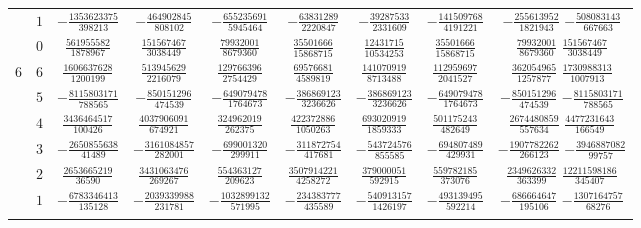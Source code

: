 \begin{table}
\begin{center}
\begin{tabular}{ccccccccc}
           &  $1$  &  $-\frac{ 1353623375}{ 398213} $  &  $-\frac{  464902845}{  808102}$  &  $-\frac{ 655235691}{ 5945464} $  &  $-\frac{  63831289}{ 2220847}$  &  $-\frac{  39287533}{ 2331609}$  &  $-\frac{ 141509768}{ 4191221} $  &  $-\frac{  255613952}{ 1821943}$  $-\frac{  508083143}{ 667663}$  \\ \addlinespace
           &  $0$  &  $ \frac{  561955582}{1878967} $  &  $ \frac{  151567467}{ 3038449}$  &  $ \frac{  79932001}{ 8679360} $  &  $ \frac{  35501666}{15868715}$  &  $ \frac{  12431715}{10534253}$  &  $ \frac{  35501666}{15868715} $  &  $ \frac{   79932001}{ 8679360}$  $ \frac{  151567467}{3038449}$  \\ \addlinespace
      $6$  &  $6$  &  $ \frac{ 1606637628}{1200199} $  &  $ \frac{  513945629}{ 2216079}$  &  $ \frac{ 129766396}{ 2754429} $  &  $ \frac{  69576681}{ 4589819}$  &  $ \frac{ 141070919}{ 8713488}$  &  $ \frac{ 112959697}{ 2041527} $  &  $ \frac{  362054965}{ 1257877}$  $ \frac{ 1730988313}{1007913}$  \\ \addlinespace
           &  $5$  &  $-\frac{ 8115803171}{ 788565} $  &  $-\frac{  850151296}{  474539}$  &  $-\frac{ 649079478}{ 1764673} $  &  $-\frac{ 386869123}{ 3236626}$  &  $-\frac{ 386869123}{ 3236626}$  &  $-\frac{ 649079478}{ 1764673} $  &  $-\frac{  850151296}{  474539}$  $-\frac{ 8115803171}{ 788565}$  \\ \addlinespace
           &  $4$  &  $ \frac{ 3436464517}{ 100426} $  &  $ \frac{ 4037906091}{  674921}$  &  $ \frac{ 324962019}{  262375} $  &  $ \frac{ 422372886}{ 1050263}$  &  $ \frac{ 693020919}{ 1859333}$  &  $ \frac{ 501175243}{  482649} $  &  $ \frac{ 2674480859}{  557634}$  $ \frac{ 4477231643}{ 166549}$  \\ \addlinespace
           &  $3$  &  $-\frac{ 2650855638}{  41489} $  &  $-\frac{ 3161084857}{  282001}$  &  $-\frac{ 699001320}{  299911} $  &  $-\frac{ 311872754}{  417681}$  &  $-\frac{ 543724576}{  855585}$  &  $-\frac{ 694807489}{  429931} $  &  $-\frac{ 1907782262}{  266123}$  $-\frac{ 3946887082}{  99757}$  \\ \addlinespace
           &  $2$  &  $ \frac{ 2653665219}{  36590} $  &  $ \frac{ 3431063476}{  269267}$  &  $ \frac{ 554363127}{  209623} $  &  $ \frac{3507914221}{ 4258272}$  &  $ \frac{ 379000051}{  592915}$  &  $ \frac{ 559782185}{  373076} $  &  $ \frac{ 2349626332}{  363399}$  $ \frac{12211598186}{ 345407}$  \\ \addlinespace
           &  $1$  &  $-\frac{ 6783346413}{ 135128} $  &  $-\frac{ 2039339988}{  231781}$  &  $-\frac{1032899132}{  571995} $  &  $-\frac{ 234383777}{  435589}$  &  $-\frac{ 540913157}{ 1426197}$  &  $-\frac{ 493139495}{  592214} $  &  $-\frac{  686664647}{  195106}$  $-\frac{ 1307164757}{  68276}$  \\ \addlinespace

\end{tabular}
\end{center}
\end{table}
